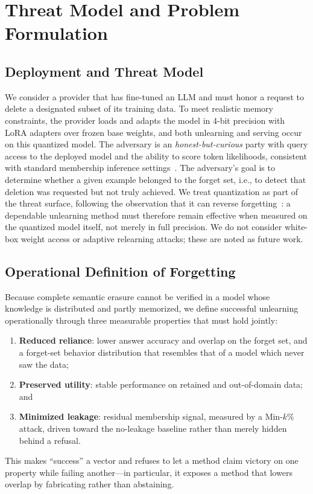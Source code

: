 \documentclass[journal]{IEEEtran}
\begin{document}
\section{Threat Model and Problem Formulation}
\label{sec:threat}

\subsection{Deployment and Threat Model}
We consider a provider that has fine-tuned an LLM and must honor a request to delete a designated subset of its training data. To meet realistic memory constraints, the provider loads and adapts the model in 4-bit precision with LoRA adapters over frozen base weights, and both unlearning and serving occur on this quantized model. The adversary is an \emph{honest-but-curious} party with query access to the deployed model and the ability to score token likelihoods, consistent with standard membership inference settings~\cite{shokri2017mia,shi2024minkprob}. The adversary's goal is to determine whether a given example belonged to the forget set, i.e., to detect that deletion was requested but not truly achieved. We treat quantization as part of the threat surface, following the observation that it can reverse forgetting~\cite{zhang2024quantization}: a dependable unlearning method must therefore remain effective when measured on the quantized model itself, not merely in full precision. We do not consider white-box weight access or adaptive relearning attacks; these are noted as future work.

\subsection{Operational Definition of Forgetting}
Because complete semantic erasure cannot be verified in a model whose knowledge is distributed and partly memorized, we define successful unlearning operationally through three measurable properties that must hold jointly:
\begin{enumerate}
\item \textbf{Reduced reliance}: lower answer accuracy and overlap on the forget set, and a forget-set behavior distribution that resembles that of a model which never saw the data;
\item \textbf{Preserved utility}: stable performance on retained and out-of-domain data; and
\item \textbf{Minimized leakage}: residual membership signal, measured by a Min-$k$\% attack, driven toward the no-leakage baseline rather than merely hidden behind a refusal.
\end{enumerate}
This makes ``success'' a vector and refuses to let a method claim victory on one property while failing another---in particular, it exposes a method that lowers overlap by fabricating rather than abstaining.
\end{document}
